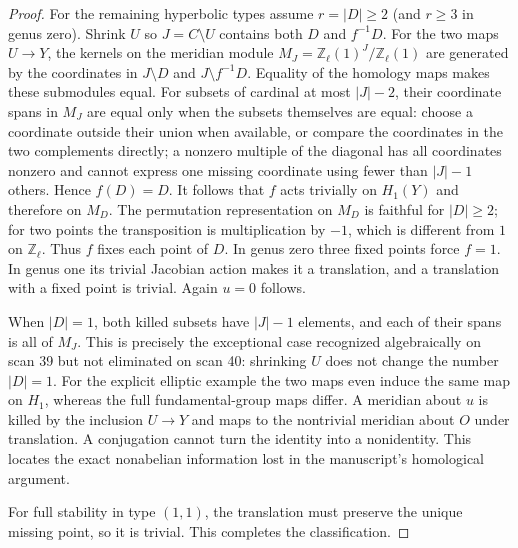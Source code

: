 \begin{proof}
For the remaining hyperbolic types assume $r=|D|\geq2$ (and $r\geq3$
in genus zero). Shrink $U$ so $J=C\setminus U$ contains both $D$ and
$f^{-1}D$. For the two maps $U\to Y$, the kernels on the meridian
module $M_J=\mathbb Z_\ell(1)^J/\mathbb Z_\ell(1)$ are generated by
the coordinates in $J\setminus D$ and $J\setminus f^{-1}D$.
Equality of the homology maps makes these submodules equal. For subsets
of cardinal at most $|J|-2$, their coordinate spans in $M_J$ are equal
only when the subsets themselves are equal: choose a coordinate outside
their union when available, or compare the coordinates in the two
complements directly; a nonzero multiple of the diagonal has all
coordinates nonzero and cannot express one missing coordinate using
fewer than $|J|-1$ others. Hence $f(D)=D$.
It follows that $f$ acts trivially on $H_1(Y)$ and therefore on $M_D$.
The permutation representation on $M_D$ is faithful for $|D|\geq2$;
for two points the transposition is multiplication by $-1$, which is
different from $1$ on $\mathbb Z_\ell$. Thus $f$ fixes each point of $D$.
In genus zero three fixed points force $f=1$. In genus one its trivial
Jacobian action makes it a translation, and a translation with a fixed
point is trivial. Again $u=0$ follows.

When $|D|=1$, both killed subsets have $|J|-1$ elements, and each of
their spans is all of $M_J$. This is precisely the exceptional case
recognized algebraically on scan 39 but not eliminated on scan 40:
shrinking $U$ does not change the number $|D|=1$. For the explicit elliptic
example the two maps even induce the same map on $H_1$, whereas the full
fundamental-group maps differ. A meridian about $u$ is killed by the
inclusion $U\to Y$ and maps to the nontrivial meridian about $O$ under
translation. A conjugation cannot turn the identity into a nonidentity.
This locates the exact nonabelian information lost in the manuscript's
homological argument.

For full stability in type $(1,1)$, the translation must preserve the
unique missing point, so it is trivial. This completes the classification.
\end{proof}


